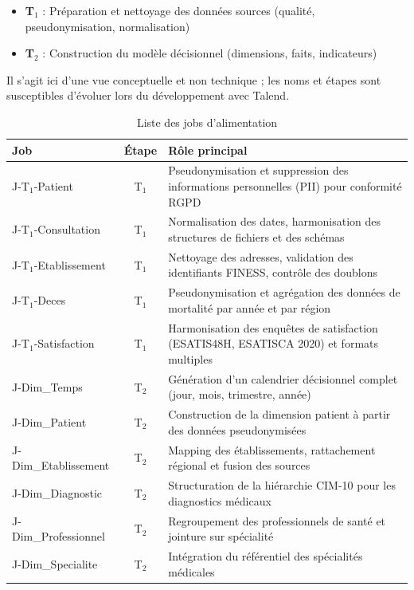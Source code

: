 \documentclass[12pt,a4paper]{article}
\begin{document}
\begin{itemize}[leftmargin=*]
    \item \textbf{T$_{1}$} : Préparation et nettoyage des données sources (qualité, pseudonymisation, normalisation)
    \item \textbf{T$_{2}$} : Construction du modèle décisionnel (dimensions, faits, indicateurs)
\end{itemize}

Il s'agit ici d'une vue conceptuelle et non technique ; les noms et étapes sont susceptibles d'évoluer lors du développement avec Talend.

\begin{table}[H]
\centering
\caption{Liste des jobs d'alimentation}
\begin{tabularx}{\textwidth}{|l|c|X|}
\hline
\textbf{Job} & \textbf{Étape} & \textbf{Rôle principal} \\
\hline
J-T$_{1}$-Patient & T$_{1}$ & Pseudonymisation et suppression des informations personnelles (PII) pour conformité RGPD \\
\hline
J-T$_{1}$-Consultation & T$_{1}$ & Normalisation des dates, harmonisation des structures de fichiers et des schémas \\
\hline
J-T$_{1}$-Etablissement & T$_{1}$ & Nettoyage des adresses, validation des identifiants FINESS, contrôle des doublons \\
\hline
J-T$_{1}$-Deces & T$_{1}$ & Pseudonymisation et agrégation des données de mortalité par année et par région \\
\hline
J-T$_{1}$-Satisfaction & T$_{1}$ & Harmonisation des enquêtes de satisfaction (ESATIS48H, ESATISCA 2020) et formats multiples \\
\hline
\hline
J-Dim\_Temps & T$_{2}$ & Génération d'un calendrier décisionnel complet (jour, mois, trimestre, année) \\
\hline
J-Dim\_Patient & T$_{2}$ & Construction de la dimension patient à partir des données pseudonymisées \\
\hline
J-Dim\_Etablissement & T$_{2}$ & Mapping des établissements, rattachement régional et fusion des sources \\
\hline
J-Dim\_Diagnostic & T$_{2}$ & Structuration de la hiérarchie CIM-10 pour les diagnostics médicaux \\
\hline
J-Dim\_Professionnel & T$_{2}$ & Regroupement des professionnels de santé et jointure sur spécialité \\
\hline
J-Dim\_Specialite & T$_{2}$ & Intégration du référentiel des spécialités médicales \\

\end{tabularx}
\end{table}
\end{document}
